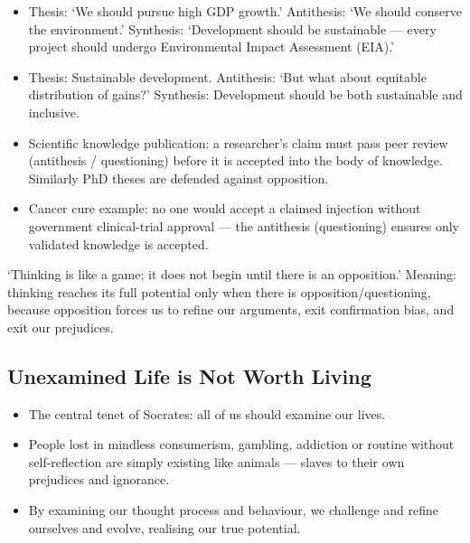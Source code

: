 \begin{ExampleBox}
\begin{itemize}
\item Thesis: `We should pursue high GDP growth.' Antithesis: `We should conserve the environment.' Synthesis: `Development should be sustainable --- every project should undergo Environmental Impact Assessment (EIA).'
\item Thesis: Sustainable development. Antithesis: `But what about equitable distribution of gains?' Synthesis: Development should be both sustainable and inclusive.
\item Scientific knowledge publication: a researcher's claim must pass peer review (antithesis / questioning) before it is accepted into the body of knowledge. Similarly PhD theses are defended against opposition.
\item Cancer cure example: no one would accept a claimed injection without government clinical-trial approval --- the antithesis (questioning) ensures only validated knowledge is accepted.
\end{itemize}
\end{ExampleBox}

\begin{PYQLink}
`Thinking is like a game; it does not begin until there is an opposition.' Meaning: thinking reaches its full potential only when there is opposition/questioning, because opposition forces us to refine our arguments, exit confirmation bias, and exit our prejudices.
\end{PYQLink}

\subsection*{Unexamined Life is Not Worth Living}
\begin{KeyConcept}
\begin{itemize}
\item The central tenet of Socrates: all of us should examine our lives.
\item People lost in mindless consumerism, gambling, addiction or routine without self-reflection are simply existing like animals --- slaves to their own prejudices and ignorance.
\item By examining our thought process and behaviour, we challenge and refine ourselves and evolve, realising our true potential.
\end{itemize}
\end{KeyConcept}

